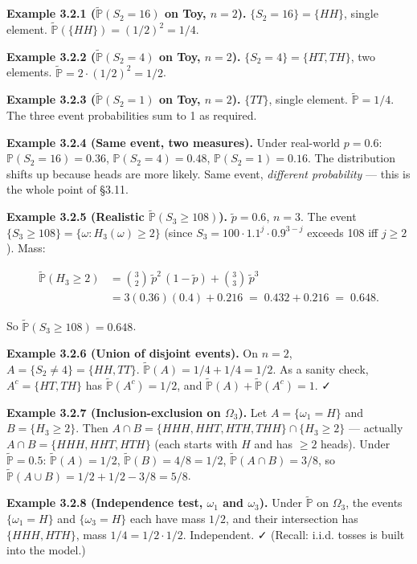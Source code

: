 \documentclass[
  10pt,
  twoside]{book}
\begin{document}
\textbf{Example 3.2.1 (\(\tilde{\mathbb P}(S_2 = 16)\) on Toy,
\(n=2\)).} \(\{S_2 = 16\} = \{HH\}\), single element.
\(\tilde{\mathbb P}(\{HH\}) = (1/2)^2 = 1/4\).

\textbf{Example 3.2.2 (\(\tilde{\mathbb P}(S_2 = 4)\) on Toy, \(n=2\)).}
\(\{S_2 = 4\} = \{HT, TH\}\), two elements.
\(\tilde{\mathbb P} = 2 \cdot (1/2)^2 = 1/2\).

\textbf{Example 3.2.3 (\(\tilde{\mathbb P}(S_2 = 1)\) on Toy, \(n=2\)).}
\(\{TT\}\), single element. \(\tilde{\mathbb P} = 1/4\). The three event
probabilities sum to 1 as required.

\textbf{Example 3.2.4 (Same event, two measures).} Under real-world
\(p = 0.6\): \(\mathbb P(S_2 = 16) = 0.36\),
\(\mathbb P(S_2 = 4) = 0.48\), \(\mathbb P(S_2 = 1) = 0.16\). The
distribution shifts up because heads are more likely. Same event,
\emph{different probability} --- this is the whole point of §3.11.

\textbf{Example 3.2.5 (Realistic \(\tilde{\mathbb P}(S_3 \ge 108)\)).}
\(\tilde p = 0.6\), \(n=3\). The event
\(\{S_3 \ge 108\} = \{\omega : H_3(\omega) \ge 2\}\) (since
\(S_3 = 100 \cdot 1.1^j \cdot 0.9^{3-j}\) exceeds 108 iff \(j \ge 2\)).
Mass:

\[
\begin{aligned}
\tilde{\mathbb P}(H_3 \ge 2)
&= \binom{3}{2}\,\tilde p^2\,(1-\tilde p) + \binom{3}{3}\,\tilde p^3 \\
&= 3(0.36)(0.4) + 0.216 \;=\; 0.432 + 0.216 \;=\; 0.648.
\end{aligned}
\]

So \(\tilde{\mathbb P}(S_3 \ge 108) = 0.648\).

\textbf{Example 3.2.6 (Union of disjoint events).} On \(n=2\),
\(A = \{S_2 \ne 4\} = \{HH, TT\}\).
\(\tilde{\mathbb P}(A) = 1/4 + 1/4 = 1/2\). As a sanity check,
\(A^c = \{HT, TH\}\) has \(\tilde{\mathbb P}(A^c) = 1/2\), and
\(\tilde{\mathbb P}(A) + \tilde{\mathbb P}(A^c) = 1\). ✓

\textbf{Example 3.2.7 (Inclusion-exclusion on \(\Omega_3\)).} Let
\(A = \{\omega_1 = H\}\) and \(B = \{H_3 \ge 2\}\). Then
\(A \cap B = \{HHH, HHT, HTH, THH\} \cap \{H_3 \ge 2\}\) --- actually
\(A \cap B = \{HHH, HHT, HTH\}\) (each starts with \(H\) and has
\(\ge 2\) heads). Under \(\tilde{\mathbb P}=0.5\):
\(\tilde{\mathbb P}(A) = 1/2\), \(\tilde{\mathbb P}(B) = 4/8 = 1/2\),
\(\tilde{\mathbb P}(A \cap B) = 3/8\), so
\(\tilde{\mathbb P}(A \cup B) = 1/2 + 1/2 - 3/8 = 5/8\).

\textbf{Example 3.2.8 (Independence test, \(\omega_1\) and
\(\omega_3\)).} Under \(\tilde{\mathbb P}\) on \(\Omega_3\), the events
\(\{\omega_1 = H\}\) and \(\{\omega_3 = H\}\) each have mass \(1/2\),
and their intersection has \(\{HHH, HTH\}\), mass
\(1/4 = 1/2 \cdot 1/2\). Independent. ✓ (Recall: i.i.d. tosses is built
into the model.)
\end{document}
